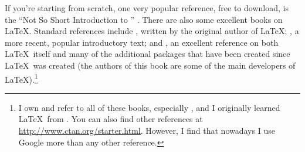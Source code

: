 \documentclass[12pt]{article}
\begin{document}
If you're starting from scratch, 
one very popular reference, free to download, is the ``Not So Short Introduction to \LaTeXe''  \citep{OetikerPartlHynaSchlegl:11}.  There are also some excellent books on \LaTeX. Standard references include \cite{Lamport:94}, written by the original author of \LaTeX; \cite{KopkaDaly:03}, a more recent, popular introductory text; and \cite{MittelbachGoossensBraamsCarlisleRowley:04}, an excellent reference on both \LaTeX\ itself and many of the additional packages that have been created since \LaTeX\ was created (the authors of this book are some of the main developers of \LaTeX).\footnote{I own and refer to all of these books, especially \cite{MittelbachGoossensBraamsCarlisleRowley:04}, and I originally learned \LaTeX\ from \cite{Lamport:94}. You can also find other references at \url{http://www.ctan.org/starter.html}. However, I find that nowadays I use Google more than any other reference.}
\end{document}
